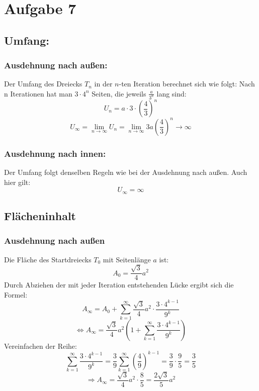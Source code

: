 \section{Aufgabe 7}
    \subsection{Umfang:}
        \subsubsection{Ausdehnung nach außen:}
            Der Umfang des Dreiecks \( T_n \) in der \( n \)-ten Iteration berechnet sich wie folgt: Nach n Iterationen hat man $3\cdot4^n$ Seiten, die jeweils $\frac{a}{3^n}$ lang sind: 
            \[
            U_n = a \cdot 3 \cdot \left(\frac{4}{3}\right)^n
            \]
            \[
            U_\infty = \lim_{n \to \infty} U_n = \lim_{n\to\infty}3a\left(\frac{4}{3}\right)^n\to \infty
            \]
    
        \subsubsection{Ausdehnung nach innen:}
            Der Umfang folgt denselben Regeln wie bei der Ausdehnung nach außen. Auch hier gilt:
            \[
            U_\infty = \infty
            \]
    
    \subsection{Flächeninhalt}
        \subsubsection{Ausdehnung nach außen}
            Die Fläche des Startdreiecks \( T_0 \) mit Seitenlänge \( a \) ist:
            \[
            A_0 = \frac{\sqrt{3}}{4} a^2
            \]
            Durch Abziehen der mit jeder Iteration entstehenden Lücke ergibt sich die Formel:
            \[
            A_\infty = A_0 + \sum_{k=1}^\infty \frac{\sqrt{3}}{4} a^2 \cdot \frac{3 \cdot 4^{k-1}}{9^k}
            \]
            \[
            \Leftrightarrow A_\infty = \frac{\sqrt{3}}{4} a^2 \left(1 + \sum_{k=1}^\infty \frac{3 \cdot 4^{k-1}}{9^k}\right)
            \]
            Vereinfachen der Reihe:
            \[
            \sum_{k=1}^\infty \frac{3 \cdot 4^{k-1}}{9^k} = \frac{3}{9} \sum_{k=1}^\infty \left(\frac{4}{9}\right)^{k-1} = \frac{3}{9} \cdot \frac{9}{5} = \frac{3}{5}
            \]
            \[
            \Rightarrow A_\infty = \frac{\sqrt{3}}{4} a^2 \cdot \frac{8}{5} = \frac{2\sqrt{3}}{5} a^2
            \]
            
